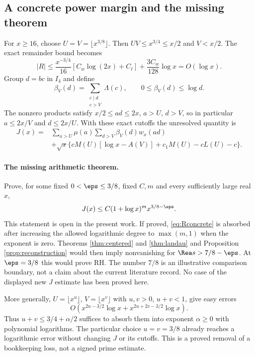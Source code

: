 \subsection{A concrete power margin and the missing theorem}
For $x\ge16$, choose $U=V=\lfloor x^{3/8}\rfloor$. Then $UV\le x^{3/4}\le x/2$ and $V<x/2$. The exact remainder bound becomes
\begin{equation}\label{eq:Rconcrete}
|R|\le\frac{x^{-3/4}}{16}[C_w\log(2x)+C_\ell]+\frac{3C_w}{128}\log x=O(\log x).
\end{equation}
Group $d=bc$ in $I_4$ and define
\[
\beta_V(d)=\sum_{\substack{c\mid d\\c>V}}\Lambda(c),\qquad0\le\beta_V(d)\le\log d.
\]
The nonzero products satisfy $x/2\le ad\le2x$, $a>U$, $d>V$, so in particular $a\le2x/V$ and $d\le2x/U$. With these exact cutoffs the unresolved quantity is
\begin{equation}\label{eq:J}
\begin{aligned}
J(x)={}&\sum_{a>U}\mu(a)\sum_{d>V}\beta_V(d)w_x(ad)\\
&+\sqrt x\{cM(U)[\log x-A(V)]+c_1M(U)-cL(U)-c\}.
\end{aligned}
\end{equation}
\paragraph{The missing arithmetic theorem.}
Prove, for some fixed $0<\eps\le3/8$, fixed $C,m$ and every sufficiently large real $x$,
\begin{equation}\label{eq:Jtarget}
J(x)\le C(1+\log x)^m x^{3/8-\eps}.
\end{equation}
This statement is open in the present work. If proved, \eqref{eq:Rconcrete} is absorbed after increasing the allowed logarithmic degree to $\max(m,1)$ when the exponent is zero. Theorems \ref{thm:centered} and \ref{thm:landau} and Proposition \ref{prop:reconstruction} would then imply nonvanishing for $\Rea s>7/8-\eps$. At $\eps=3/8$ this would prove RH. The number $7/8$ is an illustrative comparison boundary, not a claim about the current literature record. No case of the displayed new $J$ estimate has been proved here.

More generally, $U=\lfloor x^u\rfloor$, $V=\lfloor x^v\rfloor$ with $u,v>0$, $u+v<1$, give easy errors
\[
O(x^{2u-3/2}\log x+x^{2u+2v-3/2}\log x).
\]
Thus $u+v\le3/4+\alpha/2$ suffices to absorb them into exponent $\alpha\ge0$ with polynomial logarithms. The particular choice $u=v=3/8$ already reaches a logarithmic error without changing $J$ or its cutoffs. This is a proved removal of a bookkeeping loss, not a signed prime estimate.

